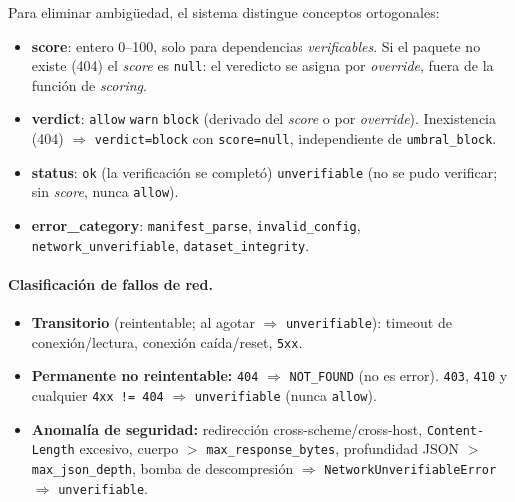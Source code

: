 \documentclass[11pt,a4paper]{article}
\begin{document}
Para eliminar ambigüedad, el sistema distingue conceptos ortogonales:
\begin{itemize}[nosep]
  \item \textbf{score}: entero 0--100, solo para dependencias \emph{verificables}.
    Si el paquete no existe (404) el \emph{score} es \texttt{null}: el veredicto
    se asigna por \emph{override}, fuera de la función de \emph{scoring}.
  \item \textbf{verdict}: \texttt{allow} \textbar{} \texttt{warn} \textbar{}
  \texttt{block} (derivado del \emph{score} o por \emph{override}).
    Inexistencia (404) $\Rightarrow$ \texttt{verdict=block} con \texttt{score=null},
    independiente de \texttt{umbral_block}.
  \item \textbf{status}: \texttt{ok} (la verificación se completó) \textbar{}
  \texttt{unverifiable} (no se pudo verificar; sin \emph{score}, nunca
  \texttt{allow}).
  \item \textbf{error\_category}: \texttt{manifest_parse}, \texttt{invalid_config},
  \texttt{network_unverifiable}, \texttt{dataset_integrity}.
\end{itemize}

\paragraph{Clasificación de fallos de red.}
\begin{itemize}[nosep]
  \item \textbf{Transitorio} (reintentable; al agotar $\Rightarrow$ \texttt{unverifiable}):
    timeout de conexión/lectura, conexión caída/reset, \texttt{5xx}.
  \item \textbf{Permanente no reintentable:} \texttt{404} $\Rightarrow$
    \texttt{NOT_FOUND} (no es error). \texttt{403}, \texttt{410} y cualquier
    \texttt{4xx != 404} $\Rightarrow$ \texttt{unverifiable} (nunca
    \texttt{allow}).
  \item \textbf{Anomalía de seguridad:} redirección cross-scheme/cross-host,
    \texttt{Content-Length} excesivo, cuerpo $>$ \texttt{max_response_bytes},
    profundidad JSON $>$ \texttt{max_json_depth}, bomba de descompresión
    $\Rightarrow$ \texttt{NetworkUnverifiableError} $\Rightarrow$ \texttt{unverifiable}.
\end{itemize}
\end{document}
